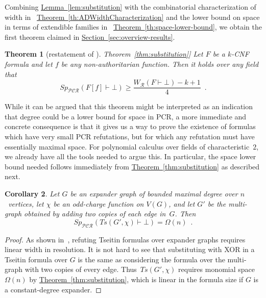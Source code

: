 \documentclass[11pt]{article}
\numberwithin{equation}{section}
\newtheorem{theorem}{Theorem}[section]
\newtheorem{corollary}[theorem]{Corollary}
\theoremstyle{definition}
\theoremstyle{plain}
\newcommand{\expref}[2]{\hyperref[#2]{#1~\ref{#2}}}
\theoremstyle{plain}
\theoremstyle{definition}
\newcommand{\refth}[1]{\expref{Theorem}{#1}}
\newcommand{\reflem}[1]{\expref{Lemma}{#1}}
\newcommand{\refsec}[1]{\expref{Section}{#1}}
\newcommand{\bigomega}[1]{\Omega ( #1 )}
\newcommand{\vertices}[1]{V( #1 )}
\newcommand{\eqperiod}{\enspace .}
\newcommand{\proofsystemsubindexformat}[1]{\scriptscriptstyle{\mathcal{#1}}}
\newcommand{\resnot}{\proofsystemsubindexformat{R}}
\newcommand{\pcrnot}{\proofsystemsubindexformat{PCR}}
\newcommand{\derivabbrevsmall}[2]{( #1 \vdash #2 )}
\newcommand{\refutabbrevsmall}[1]{\derivabbrevsmall{#1}{\!\bot}}
\newcommand{\genericrefsmall}[3]{{\mathit{#1}}_{#2}\refutabbrevsmall{#3}}
\newcommand{\widthref}[2][]{\genericrefsmall{W}{#1}{#2}}
\newcommand{\mspaceref}[2][]{\genericrefsmall{Sp}{#1}{#2}}
\newcommand{\formulaformat}[1]{\mathit{#1}}
\newcommand{\tseitinnot}[2]{\formulaformat{Ts}({#1,#2})}
\newcommand{\substform}[2]{{#1}[{#2}]}
\newcommand{\kextendibleNok}{extendible\xspace}
\newcommand{\formulakwidth}{k}
\newcommand{\nonauthor}{non-author\-i\-tar\-ian\xspace}
\newcommand{\tseitincharge}{\chi}
\begin{document}
Combining \reflem{lem:substitution}
with the combinatorial characterization of width in~%
\refth{th:ADWidthCharacterization} 
and the lower bound on space in terms of \kextendibleNok families in~%
\refth{th:space-lower-bound},
we obtain the first theorem claimed in 
\refsec{sec:overview-results}.


%
%
%
%
\begin{theorem}[restatement of \expref{Theorem}{thm:substitution}]
%
  Let $F$ be a $\formulakwidth$-CNF formula and let $f$ be any
  \nonauthor{} function. Then
  it holds over any field that %
  \begin{equation*}
    \mspaceref[\pcrnot]{\substform{F}{f}} 
    \geq 
    \frac{\widthref[\resnot]{F} - \formulakwidth + 1}{4} \eqperiod
  \end{equation*}
%
\end{theorem}

While it can be argued that this theorem might be interpreted as an
indication that degree could be a lower bound for space in PCR, a more
immediate and concrete consequence is that 
it gives us a way to prove the existence of formulas which have very
small PCR refutations, but for which any refutation must
have essentially maximal space. 
%
For polynomial calculus over fields of characteristic~$2$, we already
have all the tools needed to argue this. In particular, 
the space lower bound needed
follows immediately from
\refth{thm:substitution}
as described next.

\begin{corollary}\label{cor:tseitin-double}
  Let $G$ be
%
%
  an expander graph of bounded maximal %
  degree over $n$~vertices,
  let
  $\tseitincharge$ be an odd-charge function on 
  $\vertices{G}$,
  and let $G'$ be 
  the multi-graph obtained by adding two copies of each edge in~$G$.
%
  Then
  \begin{equation*}
    \mspaceref[\pcrnot]{\tseitinnot{G'}{\tseitincharge}} =
    \bigomega{n}
    \eqperiod
  \end{equation*}
\end{corollary}
\begin{proof}
  As shown in~\cite{BW01ShortProofs},
  refuting Tseitin formulas over expander graphs requires linear width
  in resolution. It is not hard to see that substituting with XOR in a
  Tseitin formula over $G$ is the same as considering 
  the formula over the multi-graph with two copies of every edge.
  Thus~$\tseitinnot{G'}{\tseitincharge}$ requires monomial space
  $\bigomega{n}$ 
  by
 \refth{thm:substitution},
  which is linear in the formula size if $G$ is a constant-degree expander.
\end{proof}
\end{document}
